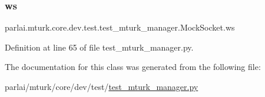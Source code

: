 \subsubsection{\texorpdfstring{ws}{ws}}
{\footnotesize\ttfamily parlai.\+mturk.\+core.\+dev.\+test.\+test\+\_\+mturk\+\_\+manager.\+Mock\+Socket.\+ws}



Definition at line 65 of file test\+\_\+mturk\+\_\+manager.\+py.



The documentation for this class was generated from the following file\+:\begin{DoxyCompactItemize}
\item 
parlai/mturk/core/dev/test/\hyperlink{dev_2test_2test__mturk__manager_8py}{test\+\_\+mturk\+\_\+manager.\+py}\end{DoxyCompactItemize}
